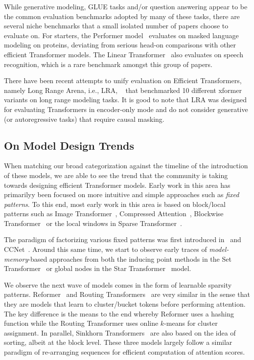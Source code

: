 While generative modeling, GLUE tasks and/or question answering appear to be the common evaluation benchmarks adopted by many of these tasks, there are several niche benchmarks that a small isolated number of papers choose to evaluate on. For starters, the Performer model~\citep{choromanski2020masked} evaluates on masked language modeling on proteins, deviating from serious head-on comparisons with other efficient Transformer models. The Linear Transformer~\citep{katharopoulos2020transformers} also evaluates on speech recognition, which is a rare benchmark amongst this group of papers. 

There have been recent attempts to unify evaluation on Efficient Transformers, namely Long Range Arena, i.e., LRA, ~\citep{tay2020long} that benchmarked 10 different xformer variants on long range modeling tasks. It is good to note that LRA was designed for evaluating Transformers in encoder-only mode and do not consider generative (or autoregressive tasks) that require causal masking.

\subsection{On Model Design Trends} When matching our broad categorization against the timeline of the introduction of these models, we are able to see the trend that the community is taking towards designing efficient Transformer models. Early work in this area has primarilyy been focused on more intuitive and simple approaches such as \textit{fixed patterns}. To this end, most early work in this area is based on block/local patterns such as Image Transformer~\citep{parmar2018image}, Compressed Attention~\citep{liu2018generating}, Blockwise Transformer~\citep{qiu2019blockwise} or the local windows in Sparse Transformer~\citep{child2019generating}. 

The paradigm of factorizing various fixed patterns was first introduced in~\citet{child2019generating} and CCNet~\citep{huang2019ccnet}. Around this same time, we start to observe early traces of \textit{model-memory}-based approaches from both the inducing point methods in the Set Transformer~\citep{lee2019set} or global nodes in the Star Transformer~\citep{guo2019star} model.

We observe the next wave of models comes in the form of learnable sparsity patterns. Reformer~\citep{kitaev2020reformer} and Routing Transformers~\citep{roy2020efficient} are very similar in the sense that they are models that learn to cluster/bucket tokens before performing attention. The key difference is the means to the end whereby Reformer uses a hashing function while the Routing Transformer uses online $k$-means for cluster assignment. In parallel, Sinkhorn Transformers~\citep{tay2020sparse} are also based on the idea of sorting, albeit at the block level. These three models largely follow a similar paradigm of re-arranging sequences for efficient computation of attention scores.

